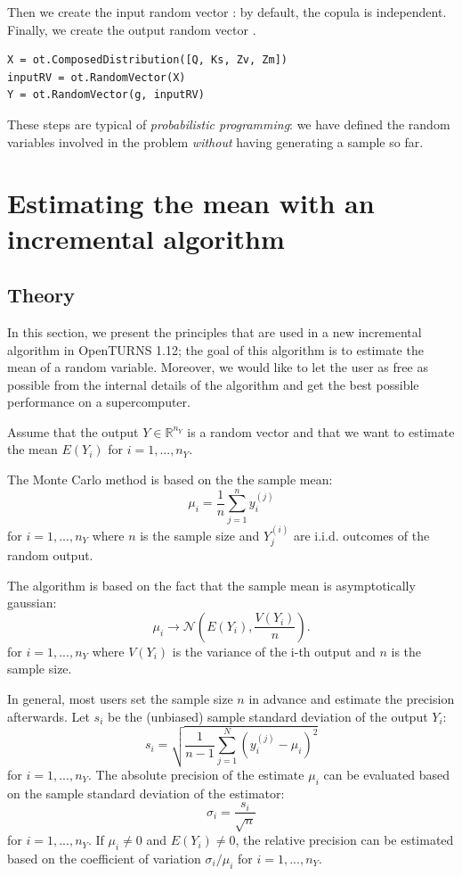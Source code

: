 \documentclass{uncecomp2019}
\begin{document}
Then we create the input random vector : by default, the copula is independent. 
Finally, we create the output random vector .
\begin{lstlisting}
X = ot.ComposedDistribution([Q, Ks, Zv, Zm])
inputRV = ot.RandomVector(X)
Y = ot.RandomVector(g, inputRV)
\end{lstlisting}

These steps are typical of \emph{probabilistic programming}: we 
have defined the random variables involved in the problem 
\emph{without} having generating a sample so far.


\section{Estimating the mean with an incremental algorithm}


\subsection{Theory}

In this section, we present the principles that are used in a new incremental 
algorithm in OpenTURNS 1.12; the goal of this algorithm is to estimate the mean of a random variable. 
Moreover, we would like to let the user as free as possible from the internal details of the algorithm 
and get the best possible performance on a supercomputer.

Assume that the output $Y\in\mathbb{R}^{n_Y}$ is a random vector and that we want to estimate the 
mean $E(Y_i)$ for $i=1,...,n_Y$. 

The Monte Carlo method is based on the the sample mean: 
$$
\mu_i = \frac{1}{n} \sum_{j=1}^n y_i^{(j)}
$$
for $i=1,...,n_Y$ where $n$ is the sample size and $Y_j^{(i)}$ are i.i.d. outcomes of the random output. 

The algorithm is based on the fact that the sample mean is asymptotically gaussian:
$$
\mu_i \rightarrow \mathcal{N}\left(E(Y_i),\frac{V(Y_i)}{n}\right).
$$
for $i=1,...,n_Y$ where $V(Y_i)$ is the variance of the i-th output and $n$ is the sample size.

In general, most users set the sample size $n$ in advance and estimate the precision afterwards. 
Let $s_i$ be the (unbiased) sample standard deviation of the output $Y_i$:
$$
s_i = \sqrt{\frac{1}{n-1} \sum_{j=1}^N \left(y_i^{(j)}-\mu_i\right)^2}
$$
for $i=1,...,n_Y$. 
The absolute precision of the estimate $\mu_i$ can be evaluated based 
on the sample standard deviation of the estimator:
$$
\sigma_i = \frac{s_i}{\sqrt{n}}
$$
for $i=1,...,n_Y$. 
If $\mu_i\neq 0$ and $E(Y_i)\neq 0$, the relative precision can 
be estimated based on the coefficient of variation $\sigma_i/\mu_i$ 
for $i=1,...,n_Y$. 
 
\end{document}
